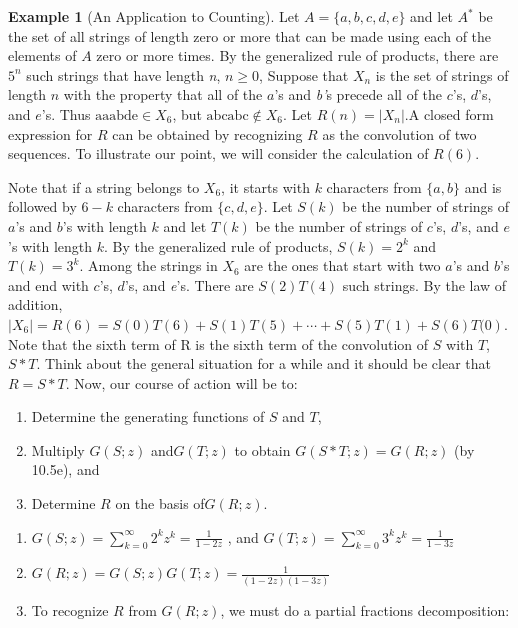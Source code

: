 \documentclass[10pt,]{book}
\theoremstyle{plain}
\theoremstyle{definition}
\theoremstyle{definition}
\theoremstyle{definition}
\newtheorem{example}[theorem]{Example}
\theoremstyle{definition}
\numberwithin{equation}{section}
\begin{document}
\begin{example}[An Application to Counting]\label{example-counting-application}
 Let \(A = \{a, b, c, d, e\}\) and let \(A^*\) be the set of all strings of length zero or more that can be made using each of the elements of \(A\) zero or more times. By the generalized rule of products, there are \(5^n\) such strings that have length \textit{
n}, \(n\geq 0\), Suppose that \(X_n\) is the set of strings of length \(n\) with the property that all of the \(a\)'s and \textit{ b'}s precede all of the \(c\)'s, \(d\)'s, and \(e\)'s. Thus \(\text{aaabde} \in  X_6\), but \(\text{abcabc} \notin  X_6\). Let \(R(n)
=\left|X_n\right|\).A closed form expression for \(R\) can be obtained by recognizing \(R\) as the convolution of two sequences.
To illustrate our point, we will consider the calculation of \(R(6)\).%
\par
Note that if a string belongs to \(X_6\), it starts with \(k\) characters from \(\{a, b\}\) and is followed by \(6 - k\) characters from \(\{c,
d, e\}\). Let \(S(k)\) be the number of strings of \(a\)'s and \(b\)'s with length \(k\) and let \(T(k)\) be the number of strings
of \(c\)'s, \(d\)'s, and \(e\)'s with length \(k\). By the generalized rule of products, \(S(k) = 2^k\) and \(T(k) = 3^k\).
Among the strings in \(X_6\) are the ones that start with two \(a\)'s and \(b\)'s and end with \(c\)'s, \(d\)'s, and \textit{
e}'s. There are \(S(2)T(4)\) such strings. By the law of addition, \(\left.\left|X_6\right| =R(6)=S(0)T(6)+S(1)T(5)+\cdots +S(5)T(1)+S(6)T(0\right)\).
Note that the sixth term of R is the sixth term of the convolution of \(S\) with \(T\), \(S*T\). Think about the general situation for
a while and it should be clear that \(R =S*T\). Now, our course of action will be to:%
\par
\leavevmode%
\begin{enumerate}[label=\alph*]
\item\hypertarget{li-157}{}Determine the generating functions of \(S\) and \(T\),%
\item\hypertarget{li-158}{}Multiply \(G(S;z)\) and\(G(T;z)\) to obtain \(G(S*T;z) = G(R;z)\) (by 10.5e), and%
\item\hypertarget{li-159}{}Determine \(R\) on the basis of\(G(R;z)\).%
\end{enumerate}
%
\par
\leavevmode%
\begin{enumerate}[label=\alph*]
\item\hypertarget{li-160}{}\(G(S;z) =\sum_{k=0}^{\infty} 2^k z^k=\frac{1}{1-2z}\) , and \(G(T;z) =\sum_{k=0}^{\infty} 3^k z^k=\frac{1}{1-3z}\)%
\item\hypertarget{li-161}{} \(G(R;z) = G(S;z)G(T;z) = \frac{1}{(1-2z)(1-3z)}\)%
\item\hypertarget{li-162}{}To recognize \(R\) from \(G(R;z)\), we must do a partial fractions decomposition:




\end{enumerate}
\end{example}
\end{document}
